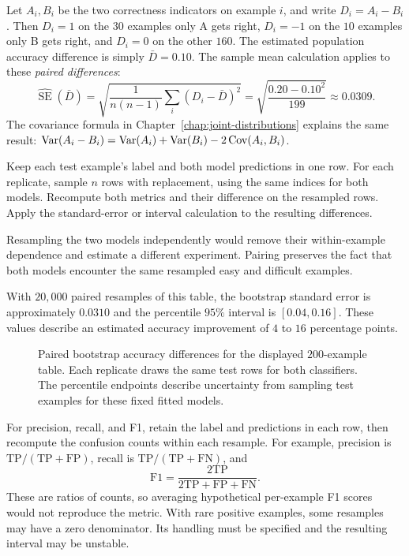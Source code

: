 Let \(A_i,B_i\) be the two correctness indicators on example \(i\),
and write \(D_i=A_i-B_i\). Then \(D_i=1\) on the \(30\)
examples only A gets right, \(D_i=-1\) on the \(10\) examples only
B gets right, and \(D_i=0\) on the other \(160\). The estimated
population accuracy difference is simply \(\bar D=0.10\).
The sample mean calculation applies to these \emph{paired differences}:
\[
  \widehat{\operatorname{SE}}(\bar D)
  =\sqrt{\frac1{n(n-1)}\sum_i(D_i-\bar D)^2}
  =\sqrt{\frac{0.20-0.10^2}{199}}\approx0.0309.
\]
The covariance formula in Chapter~\ref{chap:joint-distributions}
explains the same result:
\(\operatorname{Var}(A_i-B_i)=\operatorname{Var}(A_i)+\operatorname{Var}(B_i)-2\operatorname{Cov}(A_i,B_i)\).

\begin{result}
Keep each test example's label and both model predictions in one row.
For each replicate, sample \(n\) rows with replacement, using the
same indices for both models. Recompute both metrics and their
difference on the resampled rows. Apply the standard-error or
interval calculation to the resulting differences.
\end{result}

Resampling the two models independently would remove their within-example
dependence and estimate a different experiment. Pairing preserves the
fact that both models encounter the same resampled easy and difficult
examples.

With \(20{,}000\) paired resamples of this table, the bootstrap
standard error is approximately \(0.0310\) and the percentile
\(95\%\) interval is \([0.04,0.16]\). These values describe an
estimated accuracy improvement of \(4\) to \(16\) percentage points.

\begin{figure}[H]
  \centering\InfPairedPlot
  \caption{Paired bootstrap accuracy differences for the displayed
  \(200\)-example table. Each replicate draws the same test rows for
  both classifiers. The percentile endpoints describe uncertainty
  from sampling test examples for these fixed fitted models.}
  \label{fig:paired-bootstrap}
\end{figure}

For precision, recall, and F1, retain the label and predictions in each
row, then recompute the confusion counts within each resample. For
example, precision is \(\mathrm{TP}/(\mathrm{TP}+\mathrm{FP})\),
recall is \(\mathrm{TP}/(\mathrm{TP}+\mathrm{FN})\), and
\[
  \mathrm{F1}=\frac{2\mathrm{TP}}{2\mathrm{TP}+\mathrm{FP}+\mathrm{FN}}.
\]
These are ratios of counts, so averaging hypothetical per-example
F1 scores would not reproduce the metric. With rare positive examples,
some resamples may have a zero denominator. Its handling must be
specified and the resulting interval may be unstable.

